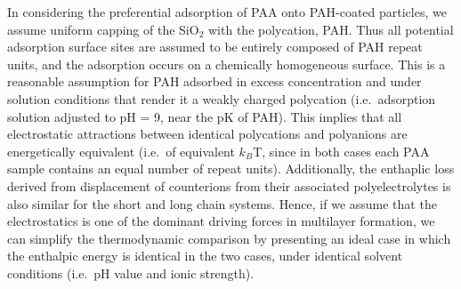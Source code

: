 \documentclass[twoside,twocolumn,9pt]{article}
\begin{document}
In considering the preferential adsorption of PAA onto PAH-coated particles, we assume uniform capping of the SiO$_2$ with the polycation, PAH.  Thus all potential adsorption surface sites are assumed to be entirely composed of PAH repeat units, and the adsorption occurs on a chemically homogeneous surface.  This is a reasonable assumption for PAH adsorbed in excess concentration and under solution conditions that render it a weakly charged polycation (i.e.\ adsorption solution adjusted to pH = 9, near the pK of PAH).\cite{Burke2003,Smith2003}  This implies that all electrostatic attractions between identical polycations and polyanions are energetically equivalent (i.e.\ of equivalent $k_B$T, since in both cases each PAA sample contains an equal number of repeat units).\cite{Dubas1999}  Additionally, the enthaplic loss derived from displacement of counterions from their associated polyelectrolytes is also similar for the short and long chain systems.  Hence, if we assume that the electrostatics is one of the dominant driving forces in multilayer formation, we can simplify the thermodynamic comparison by presenting an ideal case in which the enthalpic energy is identical in the two cases, under identical solvent conditions (i.e.\ pH value and ionic strength). 
\end{document}
